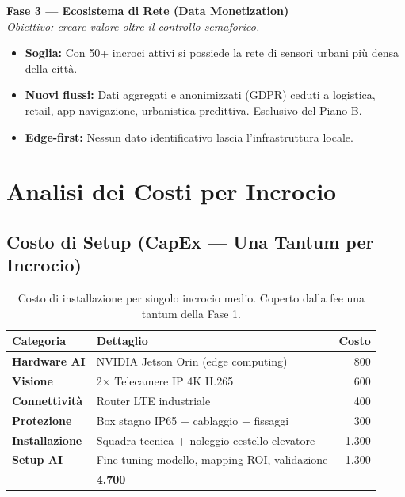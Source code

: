 \documentclass[a4paper,11pt]{article}
\begin{document}
\begin{tcolorbox}[
    enhanced, colback=blue!5!white, colframe=SmartBlue,
    title=\textbf{La Strategia in 3 Fasi},
    fonttitle=\bfseries\large, boxrule=0.5mm, drop shadow
]
\textbf{\large Fase 3 --- Ecosistema di Rete (Data Monetization)} \\
\textit{Obiettivo: creare valore oltre il controllo semaforico.}
\begin{itemize}[leftmargin=*, nosep, topsep=5pt]
    \item \textbf{Soglia:} Con 50+ incroci attivi si possiede la rete di sensori urbani più densa della città.
    \item \textbf{Nuovi flussi:} Dati aggregati e anonimizzati (GDPR) ceduti a logistica, retail, app navigazione, urbanistica predittiva. Esclusivo del Piano B.
    \item \textbf{Edge-first:} Nessun dato identificativo lascia l'infrastruttura locale.
\end{itemize}

\end{tcolorbox}

\section{Analisi dei Costi per Incrocio}

\subsection{Costo di Setup (CapEx --- Una Tantum per Incrocio)}

\begin{table}[h!]
\centering
\begin{tabular}{>{\bfseries}l l r}
\toprule
Categoria & Dettaglio & Costo \\
\midrule
Hardware AI    & NVIDIA Jetson Orin (edge computing)           & \texteuro{}800 \\
Visione        & 2$\times$ Telecamere IP 4K H.265               & \texteuro{}600 \\
Connettività   & Router LTE industriale                         & \texteuro{}400 \\
Protezione     & Box stagno IP65 + cablaggio + fissaggi         & \texteuro{}300 \\
Installazione  & Squadra tecnica + noleggio cestello elevatore  & \texteuro{}1.300 \\
Setup AI       & Fine-tuning modello, mapping ROI, validazione  & \texteuro{}1.300 \\
\midrule
\multicolumn{2}{l}{\textbf{TOTALE CapEx per Incrocio}} & \textbf{\texteuro{}4.700} \\
\bottomrule
\end{tabular}
\caption{Costo di installazione per singolo incrocio medio. Coperto dalla fee una tantum della Fase 1.}
\end{table}
\end{document}
